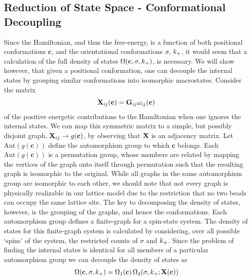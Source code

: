 \subsection{Reduction of State Space - Conformational Decoupling}

Since the Hamiltonian, and thus the free-energy, is a function of both positional conformations $\mathbf{c}$, and the orientational conformations  $\sigma, \, k_+$, it would seem that a calculation of the full density of states $\Omega(\mathbf{c},\sigma, k_+)$, is necessary. We will show however, that given a positional conformation, one can decouple the internal states by grouping similar conformations into isomorphic macrostates. Consider the matrix
\begin{equation}
\mathbf{X}_{ij} (\mathbf{c}) = \textbf{G}_{ij} \omega_{ij} (\mathbf{c})
\end{equation}
of the positive energetic contributions to the Hamiltonian when one ignores the internal states. We can map this symmetric matrix to a simple, but possibly disjoint graph, $\mathbf{X}_{ij} \rightarrow g(\mathbf{c})$, by observing that $\mathbf{X}$ is an adjacency matrix. Let $\text{Aut}(g(\mathbf{c}))$ define the automorphism group to which $\mathbf{c}$ belongs. Each $\text{Aut}(g(\mathbf{c}))$ is a permutation group, whose members are related by mapping the vertices of the graph onto itself through permutation such that the resulting graph is isomorphic to the original. While all graphs in the same automorphism group are isomorphic to each other, we should note that not every graph is physically realizable in our lattice model due to the restriction that no two beads can occupy the same lattice site. The key to decomposing the density of states, however, is the grouping of the graphs, and hence the conformations. Each automorphism group defines a finite-graph for a spin-state system. The density of states for this finite-graph system is calculated by considering, over all possible `spins' of the system, the restricted counts of $\sigma$ and $k_+$. Since the problem of finding the internal states is identical for all members of a particular automorphism group we can decouple the density of states as
\begin{equation}
\Omega(\mathbf{c}, \sigma, k_+) = \Omega_1 (\mathbf{c}) \, \Omega_2 (\sigma, k_+; \mathbf{X}(\mathbf{c}))
\end{equation}


